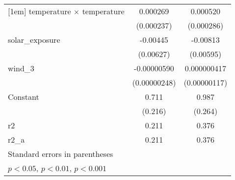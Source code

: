 {\begin{tabular}{l*{2}{c}}
[1em]
temperature $\times$ temperature&    0.000269         &    0.000520         \\
                    &  (0.000237)         &  (0.000286)         \\
[1em]
solar\_exposure      &    -0.00445         &    -0.00813         \\
                    &   (0.00627)         &   (0.00595)         \\
[1em]
wind\_3              & -0.00000590         & 0.000000417         \\
                    &(0.00000248)         &(0.00000117)         \\
[1em]
Constant            &       0.711\sym{*}  &       0.987\sym{*}  \\
                    &     (0.216)         &     (0.264)         \\
\hline
r2                  &       0.211         &       0.376         \\
r2\_a                &       0.211         &       0.376         \\
\hline\hline
\multicolumn{3}{l}{\footnotesize Standard errors in parentheses}\\
\multicolumn{3}{l}{\footnotesize \sym{*} \(p<0.05\), \sym{**} \(p<0.01\), \sym{***} \(p<0.001\)}\\
\end{tabular}
}
